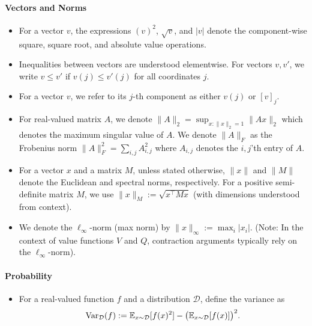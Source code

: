 \paragraph{Vectors and Norms}
\begin{itemize}
\item For a vector $v$, the expressions $(v)^2$, $\sqrt{v}$, and $|v|$ denote the
  component-wise square, square root, and absolute value operations.

\item Inequalities between vectors are understood elementwise. For vectors $v, v'$,
  we write $v \le v'$ if $v(j)\le v'(j)$ for all coordinates $j$.

\item For a vector $v$, we refer to its $j$-th component as either $v(j)$ or $[v]_j$.

\item For real-valued matrix $A$, we denote $\|A\|_2 = \sup_{x:\|x\|_2
    = 1} \|Ax\|_2$ which denotes the maximum singular value of $A$.
  We denote $\|A\|_F$ as the Frobenius norm $\|A\|_F^2 = \sum_{i,j} A_{i,j}^2$ where $A_{i,j}$ denotes the $i,j$'th entry of $A$.
  
\item For a vector $x$ and a matrix $M$, unless stated otherwise, $\|x\|$ and $\|M\|$
  denote the Euclidean and spectral norms, respectively. For a
  positive semi-definite matrix $M$, we use $\|x\|_M :=
  \sqrt{x^\top M x}$ (with dimensions understood from context).

\item We denote the $\ell_\infty$-norm (max norm) by $\|x\|_\infty := \max_i |x_i|$.
  (Note: In the context of value functions $V$ and $Q$, contraction arguments typically rely on the $\ell_\infty$-norm).
\end{itemize}

\paragraph{Probability}
\begin{itemize}
\item For a real-valued function $f$ and a distribution $\mathcal{D}$, define the variance as
\[
\textrm{Var}_{\mathcal{D}}(f) := \mathbb{E}_{x\sim \mathcal{D}}[f(x)^2] - \big(\mathbb{E}_{x\sim \mathcal{D}}[f(x)]\big)^2.
\]
\end{itemize}

